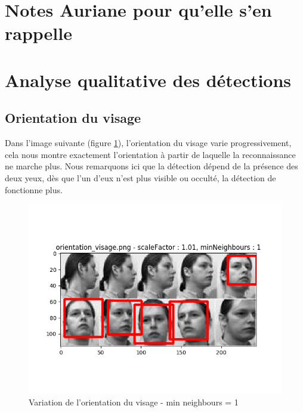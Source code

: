 \documentclass[a4paper,11pt]{article}
\begin{document}
\section{Notes Auriane pour qu'elle s'en rappelle}


\section{Analyse qualitative des détections}
    
    \subsection{Orientation du visage}
	
	Dans l'image suivante (figure \ref{fig:visage_or1}), l'orientation du visage varie
	progressivement, cela nous montre exactement l'orientation à partir de laquelle la
	reconnaissance ne marche plus. Nous remarquons ici que la détection dépend de la présence
	des deux yeux, dès que l'un d'eux n'est plus visible ou occulté, la détection de fonctionne
	plus.

	\begin{figure}[H]
	    \begin{center}
		\includegraphics[scale = 0.6]{images/orientation_visage_1,01_1.png}
		\caption{Variation de l'orientation du visage - min neighbours = 1}
		\label{fig:visage_or1}
	    \end{center}
	\end{figure}
\end{document}

